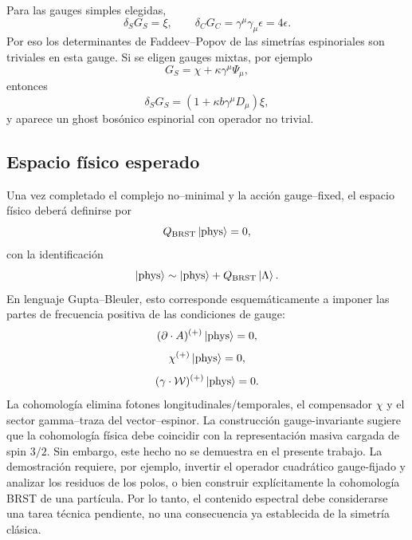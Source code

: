 \documentclass[11pt,a4paper]{article}
\numberwithin{equation}{section}
\newcommand{\Wcal}{\mathcal W}
\newcommand{\sD}{\gamma^\mu D_\mu}
\newcommand{\BRST}{\mathrm{BRST}}
\begin{document}
Para las gauges simples elegidas,
\begin{equation}
\delta_SG_S=\xi,
\qquad
\delta_CG_C=\gamma^\mu\gamma_\mu\epsilon=4\epsilon.
\end{equation}
Por eso los determinantes de Faddeev--Popov de las simetrías espinoriales son triviales en esta gauge. Si se eligen gauges mixtas, por ejemplo
\begin{equation}
G_S=\chi+\kappa\gamma^\mu\Psi_\mu,
\end{equation}
entonces
\begin{equation}
\delta_SG_S=(1+\kappa b\sD)\xi,
\end{equation}
y aparece un ghost bosónico espinorial con operador no trivial.

\subsection{Espacio físico esperado}
\label{subsec:espacio-fisico-esperado}

Una vez completado el complejo no--minimal y la acción gauge--fixed, el espacio físico deberá definirse por
\begin{equation}
\label{eq:physical-space}
Q_{\BRST}\ket{\mathrm{phys}}=0,
\end{equation}
con la identificación
\begin{equation}
\ket{\mathrm{phys}}\sim\ket{\mathrm{phys}}+Q_{\BRST}\ket{\Lambda}.
\end{equation}
En lenguaje Gupta--Bleuler, esto corresponde esquemáticamente a imponer las partes de frecuencia positiva de las condiciones de gauge:
\begin{equation}
(\partial\cdot A)^{(+)}\ket{\mathrm{phys}}=0,
\end{equation}
\begin{equation}
\chi^{(+)}\ket{\mathrm{phys}}=0,
\end{equation}
\begin{equation}
(\gamma\cdot\Wcal)^{(+)}\ket{\mathrm{phys}}=0.
\end{equation}
La cohomología elimina fotones longitudinales/temporales, el compensador $\chi$ y el sector gamma--traza del vector--espinor. La construcción gauge-invariante sugiere que la cohomología física debe coincidir con
la representación masiva cargada de spin \(3/2\). Sin embargo, este hecho no se
demuestra en el presente trabajo. La demostración requiere, por ejemplo, invertir el
operador cuadrático gauge-fijado y analizar los residuos de los polos, o bien construir
explícitamente la cohomología BRST de una partícula. Por lo tanto, el contenido
espectral debe considerarse una tarea técnica pendiente, no una consecuencia ya
establecida de la simetría clásica.
\end{document}
